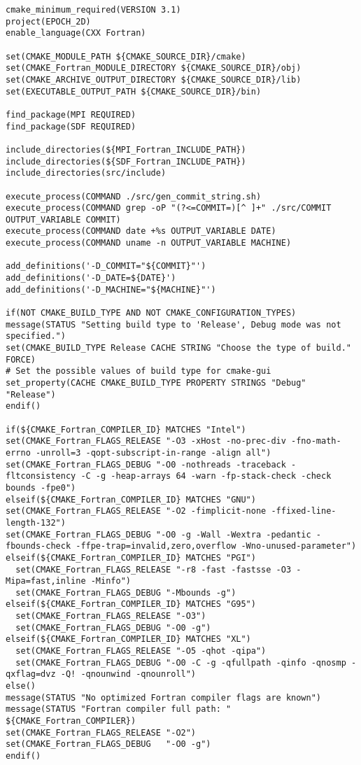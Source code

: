 \begin{lstlisting}[style=FORTRAN, caption=EPOCH CMakeLists file to generate platform-specific build scripts]
cmake_minimum_required(VERSION 3.1)
project(EPOCH_2D)
enable_language(CXX Fortran)

set(CMAKE_MODULE_PATH ${CMAKE_SOURCE_DIR}/cmake)
set(CMAKE_Fortran_MODULE_DIRECTORY ${CMAKE_SOURCE_DIR}/obj)
set(CMAKE_ARCHIVE_OUTPUT_DIRECTORY ${CMAKE_SOURCE_DIR}/lib)
set(EXECUTABLE_OUTPUT_PATH ${CMAKE_SOURCE_DIR}/bin)

find_package(MPI REQUIRED)
find_package(SDF REQUIRED)

include_directories(${MPI_Fortran_INCLUDE_PATH})
include_directories(${SDF_Fortran_INCLUDE_PATH})
include_directories(src/include)

execute_process(COMMAND ./src/gen_commit_string.sh)
execute_process(COMMAND grep -oP "(?<=COMMIT=)[^ ]+" ./src/COMMIT OUTPUT_VARIABLE COMMIT)
execute_process(COMMAND date +%s OUTPUT_VARIABLE DATE)
execute_process(COMMAND uname -n OUTPUT_VARIABLE MACHINE)

add_definitions('-D_COMMIT="${COMMIT}"')
add_definitions('-D_DATE=${DATE}')
add_definitions('-D_MACHINE="${MACHINE}"')

if(NOT CMAKE_BUILD_TYPE AND NOT CMAKE_CONFIGURATION_TYPES)
message(STATUS "Setting build type to 'Release', Debug mode was not specified.")
set(CMAKE_BUILD_TYPE Release CACHE STRING "Choose the type of build." FORCE)
# Set the possible values of build type for cmake-gui
set_property(CACHE CMAKE_BUILD_TYPE PROPERTY STRINGS "Debug" "Release")
endif()

if(${CMAKE_Fortran_COMPILER_ID} MATCHES "Intel")
set(CMAKE_Fortran_FLAGS_RELEASE "-O3 -xHost -no-prec-div -fno-math-errno -unroll=3 -qopt-subscript-in-range -align all")
set(CMAKE_Fortran_FLAGS_DEBUG "-O0 -nothreads -traceback -fltconsistency -C -g -heap-arrays 64 -warn -fp-stack-check -check bounds -fpe0")
elseif(${CMAKE_Fortran_COMPILER_ID} MATCHES "GNU")
set(CMAKE_Fortran_FLAGS_RELEASE "-O2 -fimplicit-none -ffixed-line-length-132")
set(CMAKE_Fortran_FLAGS_DEBUG "-O0 -g -Wall -Wextra -pedantic -fbounds-check -ffpe-trap=invalid,zero,overflow -Wno-unused-parameter")
elseif(${CMAKE_Fortran_COMPILER_ID} MATCHES "PGI")
  set(CMAKE_Fortran_FLAGS_RELEASE "-r8 -fast -fastsse -O3 -Mipa=fast,inline -Minfo")
  set(CMAKE_Fortran_FLAGS_DEBUG "-Mbounds -g")
elseif(${CMAKE_Fortran_COMPILER_ID} MATCHES "G95")
  set(CMAKE_Fortran_FLAGS_RELEASE "-O3")
  set(CMAKE_Fortran_FLAGS_DEBUG "-O0 -g")
elseif(${CMAKE_Fortran_COMPILER_ID} MATCHES "XL")
  set(CMAKE_Fortran_FLAGS_RELEASE "-O5 -qhot -qipa")
  set(CMAKE_Fortran_FLAGS_DEBUG "-O0 -C -g -qfullpath -qinfo -qnosmp -qxflag=dvz -Q! -qnounwind -qnounroll")
else()
message(STATUS "No optimized Fortran compiler flags are known")
message(STATUS "Fortran compiler full path: " ${CMAKE_Fortran_COMPILER})
set(CMAKE_Fortran_FLAGS_RELEASE "-O2")
set(CMAKE_Fortran_FLAGS_DEBUG   "-O0 -g")
endif()


\end{lstlisting}
